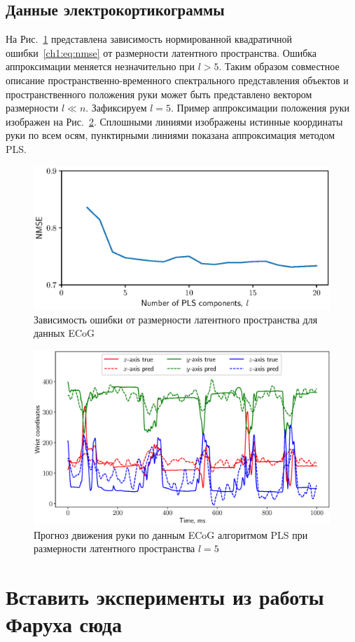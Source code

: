 \subsection*{Данные электрокортикограммы}

На Рис.~\ref{ch1:fig:ecog_n_comp} представлена зависимость нормированной квадратичной ошибки~\eqref{ch1:eq:nmse} от размерности латентного пространства. Ошибка аппроксимации меняется незначительно при $l > 5$.
Таким образом совместное описание пространственно-временного спектрального представления объектов и пространственного положения руки может быть представлено вектором размерности $l \ll n$.
Зафиксируем $l = 5$. 
Пример аппроксимации положения руки изображен на Рис.~\ref{ch1:fig:ecog_prediction}. 
Сплошными линиями изображены истинные координаты руки по всем осям, пунктирными линиями показана аппроксимация методом PLS.
 
\begin{figure}[ht]
	\centering
	\includegraphics[width=0.75\linewidth]{figs/ch1/ecog_n_comp}	
	\caption{Зависимость ошибки от размерности латентного пространства для данных ECoG}
	\label{ch1:fig:ecog_n_comp}
\end{figure}

\begin{figure}[ht]
	\centering
	\includegraphics[width=\textwidth]{figs/ch1/ecog_prediction}
	\caption{Прогноз движения руки по данным ECoG алгоритмом PLS при размерности латентного пространства $l=5$}
	\label{ch1:fig:ecog_prediction}
\end{figure}

\section{Вставить эксперименты из работы Фаруха сюда}
